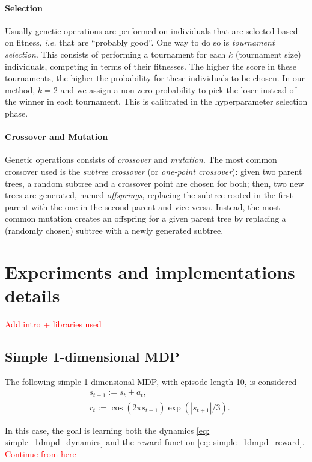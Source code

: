\documentclass[11pt]{article}
\begin{document}
\paragraph{Selection} Usually genetic operations are performed on individuals that are selected based on fitness, \textsl{i.e.} that are ``probably good''. One way to do so is \textsl{tournament selection}. This consists of performing a tournament for each $k$ (tournament size) individuals, competing in terms of their fitnesses. The higher the score in these tournaments, the higher the probability for these individuals to be chosen. In our method, $k=2$ and we assign a non-zero probability to pick the loser instead of the winner in each tournament. This is calibrated in the hyperparameter selection phase. 

\paragraph{Crossover and Mutation} Genetic operations consists of \textsl{crossover} and \textsl{mutation}. The most common crossover used is the \textsl{subtree crossover} (or \textsl{one-point crossover}): given two parent trees, a random subtree and a crossover point are chosen for both; then, two new trees are generated, named \textsl{offsprings}, replacing the subtree rooted in the first parent with the one in the second parent and vice-versa.
Instead, the most common mutation creates an offspring for a given parent tree by replacing a (randomly chosen) subtree with a newly generated subtree. 

\section{Experiments and implementations details}
\textcolor{red}{Add intro + libraries used}


\subsection{Simple 1-dimensional MDP}
The following simple 1-dimensional MDP, with episode length 10, is considered
\begin{align}
	&s_{t+1} := s_t + a_t, \label{eq: simple_1dmpd_dynamics}\\ 
	&r_t := \cos(2\pi s_{t+1})\exp(|s_{t+1}|/3). \label{eq: simple_1dmpd_reward}
\end{align}

In this case, the goal is learning both the dynamics \eqref{eq: simple_1dmpd_dynamics} and the reward function \eqref{eq: simple_1dmpd_reward}. \textcolor{red}{Continue from here}
\end{document}
